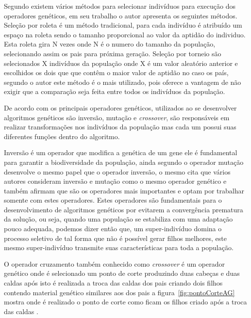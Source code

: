 
Segundo \cite{lobo2005soluccao} existem vários métodos para selecionar indivíduos para execução dos operadores genéticos, em seu trabalho o autor apresenta os seguintes métodos. Seleção por roleta é um método tradicional, para cada indivíduo é atribuído um espaço na roleta sendo o tamanho proporcional ao valor da aptidão do individuo. Esta roleta gira N vezes onde N é o numero do tamanho da população, selecionando assim os pais para próxima geração. Seleção por torneio são selecionados X indivíduos da população onde X é um valor aleatório anterior e escolhidos os dois que que contêm o maior valor de aptidão no caso os país, segundo o autor este método é o mais utilizado, pois oferece a vantagem de não exigir que a comparação seja feita entre todos os indivíduos da população.\par


De acordo com \cite{goes2005otimizaccao} os principais operadores genéticos, utilizados ao se desenvolver algoritmos genéticos são inversão, mutação e \textit{crossover}, são responsáveis em realizar transformações nos indivíduos da população mas cada um possui suas diferentes funções dentro do algoritmo.\par
Inversão é um operador que modifica a genética de um gene ele é fundamental para garantir a biodiversidade da população, ainda segundo \cite{goes2005otimizaccao} o operador mutação  desenvolve o mesmo papel que o operador inversão, o mesmo cita que vários autores consideram inversão e mutação como o mesmo operador genético e também afirmam que são os operadores mais importantes e optam por trabalhar somente com estes operadores. Estes operadores são fundamentais para o desenvolvimento de algoritmos genéticos por evitarem a convergência prematura da solução, ou seja, quando uma população se estabiliza com uma adaptação pouco adequada, podemos dizer então que, um super-indivíduo domina o processo seletivo de tal forma que não é possível gerar filhos melhores, este mesmo super-indivíduo transmite suas características para toda a população.\par

O operador cruzamento também conhecido como \textit{crossover} é um operador genético onde é selecionado um ponto de corte produzindo duas cabeças e duas caldas após isto é realizada a troca das caldas dos pais criando dois filhos contendo material genético similares aos dos pais a figura~\ref{fig:pontoCorteAG} mostra onde é realizado o ponto de corte como ficam os filhos criado após a troca das caldas \cite{de1999introduccao}.

